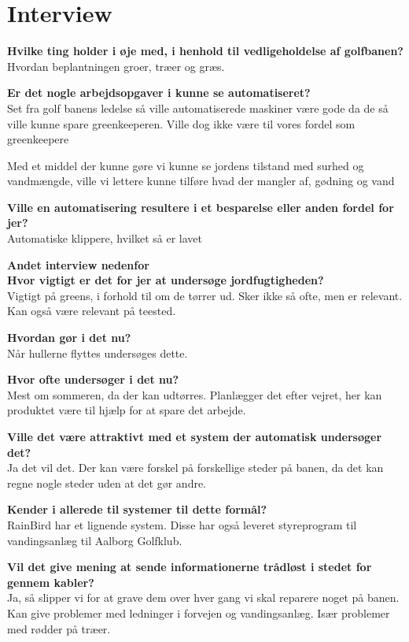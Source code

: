 \chapter{Interview} \label{cha:interviewKim}
\textbf{Hvilke ting holder i øje med, i henhold til vedligeholdelse af golfbanen?}\\
Hvordan beplantningen groer, træer og græs.

\textbf{Er det nogle arbejdsopgaver i kunne se automatiseret?}\\
Set fra golf banens ledelse så ville automatiserede maskiner være gode da de så ville kunne spare greenkeeperen.
Ville dog ikke være til vores fordel som greenkeepere

Med et middel der kunne gøre vi kunne se jordens tilstand med surhed og vandmængde, ville vi lettere kunne tilføre hvad der mangler af, gødning og vand

\textbf{Ville en automatisering resultere i et besparelse eller anden fordel for jer?}\\
Automatiske klippere, hvilket så er lavet 

\textbf{Andet interview nedenfor}\\

\textbf{Hvor vigtigt er det for jer at undersøge jordfugtigheden?}\\
Vigtigt på greens, i forhold til om de tørrer ud. Sker ikke så ofte, men er relevant.
Kan også være relevant på teested.

\textbf{Hvordan gør i det nu?}\\
Når hullerne flyttes undersøges dette.

\textbf{Hvor ofte undersøger i det nu?}\\
Mest om sommeren, da der kan udtørres. Planlægger det efter vejret, her kan produktet være til hjælp for at spare det arbejde.

\textbf{Ville det være attraktivt med et system der automatisk undersøger det?}\\
Ja det vil det. Der kan være forskel på forskellige steder på banen, da det kan regne nogle steder uden at det gør andre.

\textbf{Kender i allerede til systemer til dette formål?}\\
RainBird har et lignende system. Disse har også leveret styreprogram til vandingsanlæg til Aalborg Golfklub.

\textbf{Vil det give mening at sende informationerne trådløst i stedet for gennem kabler?}\\
Ja, så slipper vi for at grave dem over hver gang vi skal reparere noget på banen. Kan give problemer med ledninger i forvejen og vandingsanlæg. Især problemer med rødder på træer.

